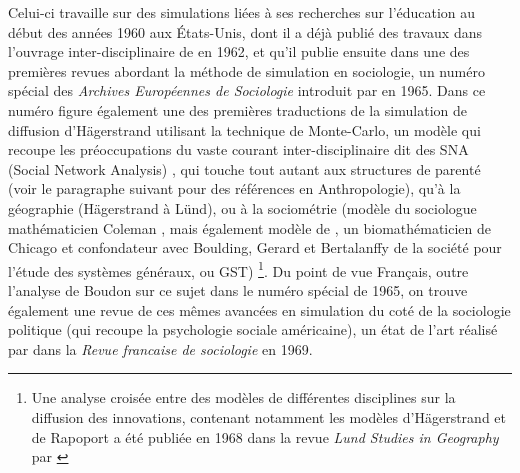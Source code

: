 Celui-ci travaille sur des simulations liées à ses recherches sur l'éducation au début des années 1960 aux États-Unis, dont il a déjà publié des travaux dans l'ouvrage inter-disciplinaire de \textcite{Guetzkow1962} en 1962, et qu'il publie ensuite \autocite{Coleman1965} dans une des premières revues abordant la méthode de simulation en sociologie, un numéro spécial des \textit{Archives Européennes de Sociologie} introduit par \textcite{Boudon1965} en 1965. Dans ce  numéro figure également une des premières traductions de la simulation de diffusion d'Hägerstrand \autocite{Hagerstrand1965} utilisant la technique de Monte-Carlo, un modèle qui recoupe les préoccupations du vaste courant inter-disciplinaire dit des SNA (Social Network Analysis) \autocite{Bernard2005}, qui touche tout autant aux structures de parenté (voir le paragraphe suivant pour des références en Anthropologie), qu'à la géographie (Hägerstrand à Lünd), ou à la sociométrie (modèle du sociologue mathématicien Coleman \textcite{Coleman1957}, mais également modèle de \textcite{Rapoport1961}, un biomathématicien de Chicago et confondateur avec Boulding, Gerard et Bertalanffy de la société pour l'étude des systèmes généraux, ou GST) \footnote{Une analyse croisée entre des modèles de différentes disciplines sur la diffusion des innovations, contenant notamment les modèles d'Hägerstrand et de Rapoport a été publiée en 1968 dans la revue \textit{Lund Studies in Geography} par \textcite{Brown1968}}. Du point de vue Français, outre l'analyse de Boudon sur ce sujet dans le numéro spécial de 1965, on trouve également une revue de ces mêmes avancées en simulation du coté de la sociologie politique (qui recoupe la psychologie sociale américaine), un état de l'art réalisé par \textcite{Padioleau1969} dans la \textit{Revue francaise de sociologie} en 1969.


